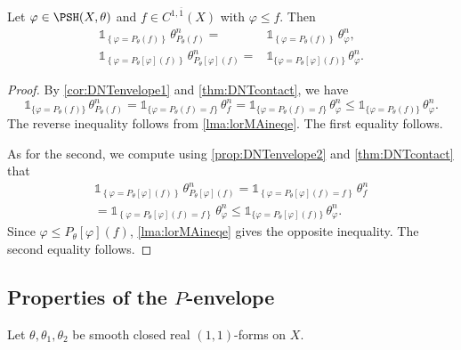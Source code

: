 \begin{proposition}\label{prop:DNTenvelope3}
    Let $\varphi\in\PSH(X,\theta)$ and $f\in C^{1,\overline{1}}(X)$ with $\varphi\leq f$. Then
    \[
    \begin{aligned}
        \mathds{1}_{\left\{\varphi=P_\theta(f)\right\}}\,\theta^n_{P_\theta(f)} =& \mathds{1}_{\left\{\varphi=P_\theta(f)\right\}}\,\theta^n_\varphi, \\
        \mathds{1}_{\left\{\varphi=P_\theta[\varphi](f)\right\}}\,\theta^n_{P_\theta[\varphi](f)} =& \mathds{1}_{\{\varphi=P_\theta[\varphi](f)\}}\,\theta^n_\varphi.
    \end{aligned}
    \]
\end{proposition}
\begin{proof}
    By \cref{cor:DNTenvelope1} and \cref{thm:DNTcontact}, we have
    \[
        \mathds{1}_{\{\varphi=P_\theta(f)\}}\,\theta^n_{P_\theta(f)}=\mathds{1}_{\{\varphi=P_\theta(f)=f\}}\,\theta^n_{f}=\mathds{1}_{\{\varphi=P_\theta(f)=f\}}\,\theta^n_{\varphi}\leq \mathds{1}_{\{\varphi=P_\theta(f)\}}\,\theta^n_{\varphi}.
    \]
    The reverse inequality follows from \cref{lma:lorMAineqe}. The first equality follows.

    As for the second, we compute using \cref{prop:DNTenvelope2} and \cref{thm:DNTcontact} that
    \[
    \begin{split}
    \mathds{1}_{\left\{\varphi=P_\theta[\varphi](f)\right\}}\,\theta^n_{P_\theta[\varphi](f)}=\mathds{1}_{\left\{\varphi=P_\theta[\varphi](f)=f\right\}}\,\theta^n_{f}\\
    =\mathds{1}_{\left\{\varphi=P_\theta[\varphi](f)=f\right\}}\,\theta_{\varphi}^n\leq \mathds{1}_{\{\varphi=P_\theta[\varphi](f)\}}\,\theta^n_\varphi.
    \end{split}
    \]
    Since $\varphi\leq P_{\theta}[\varphi](f)$, \cref{lma:lorMAineqe} gives the opposite inequality. The second equality follows.
\end{proof}

\subsection{Properties of the \texorpdfstring{$P$}{P}-envelope}
\label{subsec:Penv_prop}
Let $\theta,\theta_1,\theta_2$ be smooth closed real $(1,1)$-forms on $X$.

